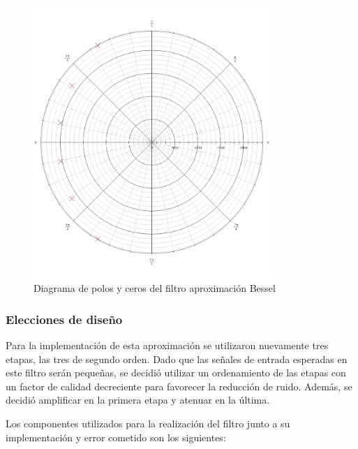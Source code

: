 \begin{figure}[H]
\centering
	\centering
	\includegraphics[width=0.8\textwidth]{Imagenes-Ej1/bessel_poles.png}
	\caption{Diagrama de polos y ceros del filtro aproximación Bessel}
	\label{leg_poles}
\end{figure}

\subsubsection{Elecciones de diseño}

Para la implementación de esta aproximación se utilizaron nuevamente tres etapas, las tres de segundo orden. Dado que las señales de entrada esperadas en este filtro serán pequeñas, se decidió utilizar un ordenamiento de las etapas con un factor de calidad decreciente para favorecer la reducción de ruido. Además, se decidió amplificar en la primera etapa y atenuar en la última.

Los componentes utilizados para la realización del filtro junto a su implementación y error cometido son los siguientes:

